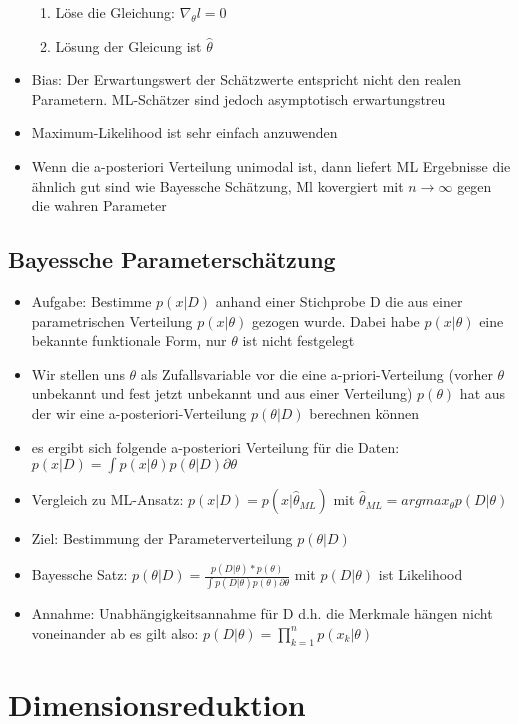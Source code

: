 \documentclass{article} %
\begin{document}
\begin{itemize}
\begin{enumerate}
			\item Löse die Gleichung: $\nabla_\theta l = 0$
			\item Lösung der Gleicung ist $\hat{\theta}$
		\end{enumerate}
		\item Bias: Der Erwartungswert der Schätzwerte entspricht nicht den realen Parametern. ML-Schätzer sind jedoch asymptotisch erwartungstreu
		\item Maximum-Likelihood ist sehr einfach anzuwenden
		\item Wenn die a-posteriori Verteilung unimodal ist, dann liefert ML Ergebnisse die ähnlich gut sind wie Bayessche Schätzung, Ml kovergiert mit $n \rightarrow \infty$ gegen die wahren Parameter
	\end{itemize}
	\subsection{Bayessche Parameterschätzung}
	\begin{itemize}
		\item Aufgabe: Bestimme $p(x|D)$ anhand einer Stichprobe D die aus einer parametrischen Verteilung $p(x|\theta)$ gezogen wurde. Dabei habe $p(x|\theta)$ eine bekannte funktionale Form, nur $\theta$ ist nicht festgelegt
		\item Wir stellen uns $\theta$ als Zufallsvariable vor die eine a-priori-Verteilung (vorher $\theta$ unbekannt und fest jetzt unbekannt und aus einer Verteilung) $p(\theta)$ hat aus der wir eine a-posteriori-Verteilung $p(\theta|D)$ berechnen können
		\item es ergibt sich folgende a-posteriori Verteilung für die Daten: $p(x|D) = \int p(x|\theta)p(\theta|D) \partial\theta$
		\item Vergleich zu ML-Ansatz: $p(x|D) = p(x|\hat{\theta}_{ML})$ mit $\hat{\theta}_{ML} = arg max_\theta p(D|\theta)$
		\item Ziel: Bestimmung der Parameterverteilung $p(\theta|D)$
		\item Bayessche Satz: $p(\theta|D) = \frac{p(D|\theta)*p(\theta)}{\int p(D|\theta)p(\theta)\partial\theta}$ mit $p(D|\theta)$ ist Likelihood
		\item Annahme: Unabhängigkeitsannahme für D d.h. die Merkmale hängen nicht voneinander ab es gilt also: $p(D|\theta) = \prod_{k=1}^{n}p(x_k|\theta)$
	\end{itemize}
\section{Dimensionsreduktion}
\end{document}
